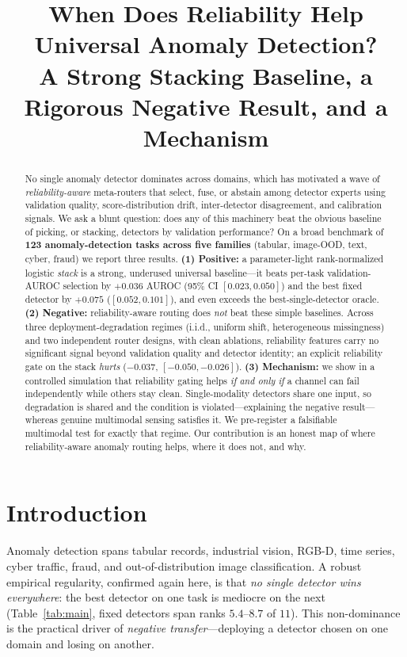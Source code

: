 \documentclass[11pt]{article}
\title{\textbf{When Does Reliability Help Universal Anomaly Detection?\\
A Strong Stacking Baseline, a Rigorous Negative Result, and a Mechanism}}
\author{}
\date{}
\begin{document}
\maketitle

\begin{abstract}
No single anomaly detector dominates across domains, which has motivated a wave of
\emph{reliability-aware} meta-routers that select, fuse, or abstain among detector
experts using validation quality, score-distribution drift, inter-detector
disagreement, and calibration signals. We ask a blunt question: does any of this
machinery beat the obvious baseline of picking, or stacking, detectors by
validation performance? On a broad benchmark of \textbf{123 anomaly-detection tasks
across five families} (tabular, image-OOD, text, cyber, fraud) we report three
results. \textbf{(1) Positive:} a parameter-light rank-normalized logistic
\emph{stack} is a strong, underused universal baseline---it beats per-task
validation-AUROC selection by $+0.036$ AUROC (95\% CI $[0.023,0.050]$) and the best
fixed detector by $+0.075$ ($[0.052,0.101]$), and even exceeds the best-single-detector
oracle. \textbf{(2) Negative:} reliability-aware routing does \emph{not} beat these
simple baselines. Across three deployment-degradation regimes (i.i.d., uniform shift,
heterogeneous missingness) and two independent router designs, with clean ablations,
reliability features carry no significant signal beyond validation quality and
detector identity; an explicit reliability gate on the stack \emph{hurts} ($-0.037$,
$[-0.050,-0.026]$). \textbf{(3) Mechanism:} we show in a controlled simulation that
reliability gating helps \emph{if and only if} a channel can fail independently while
others stay clean. Single-modality detectors share one input, so degradation is
shared and the condition is violated---explaining the negative result---whereas
genuine multimodal sensing satisfies it. We pre-register a falsifiable multimodal
test for exactly that regime. Our contribution is an honest map of where
reliability-aware anomaly routing helps, where it does not, and why.
\end{abstract}

\section{Introduction}
Anomaly detection spans tabular records, industrial vision, RGB-D, time series,
cyber traffic, fraud, and out-of-distribution image classification. A robust
empirical regularity, confirmed again here, is that \emph{no single detector wins
everywhere}: the best detector on one task is mediocre on the next (Table~\ref{tab:main},
fixed detectors span ranks $5.4$--$8.7$ of $11$). This non-dominance is the practical
driver of \emph{negative transfer}---deploying a detector chosen on one domain and
losing on another.
\end{document}
